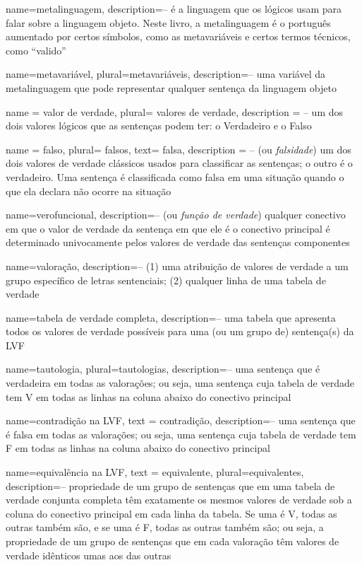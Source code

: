 {
name=metalinguagem,
description={-- é a linguagem que os lógicos usam para falar sobre a linguagem objeto. Neste livro, a metalinguagem é o português aumentado por certos símbolos, como as metavariáveis e certos termos técnicos, como ``valido''}
}

{
name=metavariável,
plural=metavariáveis,
description={-- uma variável da metalinguagem que pode representar qualquer sentença da linguagem objeto}
}

{
name = valor de verdade,
plural= valores de verdade,
description = {-- um dos dois valores lógicos que as sentenças podem ter: o Verdadeiro e o Falso}
}

{
name = falso,
plural= falsos,
text= falsa,
description = {-- (ou \textit{falsidade}) um dos dois valores de verdade clássicos usados para classificar as sentenças; o outro é o verdadeiro. Uma sentença é classificada como falsa em uma situação quando o que ela declara não ocorre na situação}
}

{
name=verofuncional,
description={-- (ou \textit{função de verdade}) qualquer conectivo em que o valor de verdade da sentença em que ele é o conectivo principal é determinado univocamente pelos valores de verdade das sentenças componentes}
}

{
name=valoração,
description={-- (1) uma atribuição de valores de verdade a um grupo específico de letras sentenciais; (2) qualquer linha de uma tabela de verdade}
}

{
name=tabela de verdade completa,
description={-- uma tabela que apresenta todos os valores de verdade possíveis para uma (ou um grupo de) sentença(s) da LVF}
}

{
name=tautologia,
plural=tautologias,
description={-- uma sentença que é verdadeira em todas as valorações; ou seja, uma sentença cuja tabela de verdade tem V em todas as linhas na coluna abaixo do conectivo principal}
}

{
  name=contradição na LVF,
  text = contradição,
description={-- uma sentença que é falsa em todas as valorações; ou seja, uma sentença cuja tabela de verdade tem F em todas as linhas na coluna abaixo do conectivo principal}
}

{
  name=equivalência na LVF,
  text = equivalente,
  plural=equivalentes,
description={-- propriedade de um grupo de sentenças que em uma tabela de verdade conjunta completa têm exatamente os mesmos valores de verdade sob a coluna do conectivo principal em cada linha da tabela. Se uma é V, todas as outras também são, e se uma é F, todas as outras também são; ou seja, a propriedade de um grupo de sentenças que em cada valoração têm valores de verdade idênticos umas aos das outras}
}

